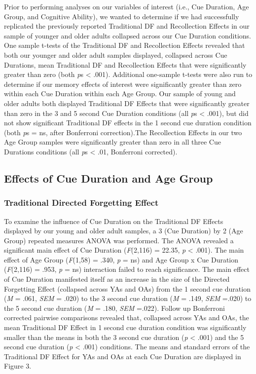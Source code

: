 \documentclass[man]{apa6}\usepackage[]{graphicx}\usepackage[]{color}
\begin{document}
Prior to performing analyses on our variables of interest (i.e., Cue Duration, Age Group, and Cognitive Ability), we wanted to determine if we had successfully replicated the previously reported Traditional DF and Recollection Effects in our sample of younger and older adults collapsed across our Cue Duration conditions. One sample t-tests of the Traditional DF and Recollection Effects revealed that both our younger and older adult samples displayed, collapsed across Cue Durations, mean Traditional DF and Recollection Effects that were significantly greater than zero (both \textit{p}s < .001). Additional one-sample t-tests were also run to determine if our memory effects of interest were significantly greater than zero within each Cue Duration within each Age Group. Our sample of young and older adults both displayed Traditional DF Effects that were significantly greater than zero in the 3 and 5 second Cue Duration conditions (all \textit{p}s < .001), but did not show significant Traditional DF effects in the 1 second cue duration condition (both \textit{p}s = ns, after Bonferroni correction).The Recollection Effects in our two Age Group samples were significantly greater than zero in all three Cue Durations conditions (all \textit{p}s < .01, Bonferroni corrected).

\subsection*{Effects of Cue Duration and Age Group}

\subsubsection*{Traditional Directed Forgetting Effect}

To examine the influence of Cue Duration on the Traditional DF Effects displayed by our young and older adult samples, a 3 (Cue Duration) by 2 (Age Group) repeated measures ANOVA was performed. The ANOVA revealed a significant main effect of Cue Duration (\textit{F}(2,116) = 22.35, \textit{p} < .001). The main effect of Age Group (\textit{F}(1,58) = .340, \textit{p} = ns) and Age Group x Cue Duration (\textit{F}(2,116) = .953, \textit{p} = ns) interaction failed to reach significance. The main effect of Cue Duration manifested itself as an increase in the size of the Directed Forgetting Effect (collapsed across YAs and OAs) from the 1 second cue duration (\textit{M} = .061, \textit{SEM} = .020) to the 3 second cue duration (\textit{M} = .149, \textit{SEM} =.020) to the 5 second cue duration (\textit{M} = .180, \textit{SEM} =.022). Follow up Bonferroni corrected pairwise comparisons revealed that, collapsed across YAs and OAs, the mean Traditional DF Effect in 1 second cue duration condition was significantly smaller than the means in both the 3 second cue duration (\textit{p} < .001) and the 5 second cue duration (\textit{p} < .001) conditions. The means and standard errors of the Traditional DF Effect for YAs and OAs at each Cue Duration are displayed in Figure 3.
\end{document}
